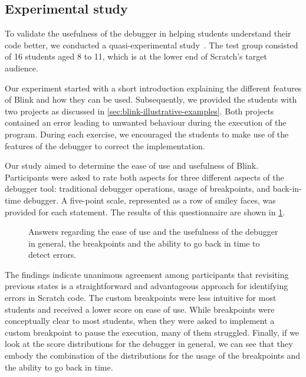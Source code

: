 \documentclass[../main]{subfiles}
\begin{document}
\subsection{Experimental study}\label{subsec:blink-experimental-study}
To validate the usefulness of the debugger in helping students understand their code better, we conducted a quasi-experimental study~\autocite{shadishExperimentalQuasiexperimentalDesigns2002}.
The test group consisted of 16 students aged 8 to 11, which is at the lower end of Scratch's target audience.

Our experiment started with a short introduction explaining the different features of Blink and how they can be used.
Subsequently, we provided the students with two projects as discussed in \cref{sec:blink-illustrative-examples}.
Both projects contained an error leading to unwanted behaviour during the execution of the program.
During each exercise, we encouraged the students to make use of the features of the debugger to correct the implementation.

Our study aimed to determine the ease of use and usefulness of Blink.
Participants were asked to rate both aspects for three different aspects of the debugger tool: traditional debugger operations, usage of breakpoints, and back-in-time debugger.
A five-point scale, represented as a row of smiley faces, was provided for each statement.
The results of this questionnaire are shown in \cref{fig:blink-results}.

\begin{figure}
    \centering
    
    \caption{
        Answers regarding the ease of use and the usefulness of the debugger in general,
        the breakpoints and the ability to go back in time to detect errors.
    }
    \label{fig:blink-results}
\end{figure}

The findings indicate unanimous agreement among participants that revisiting previous states is a straightforward and advantageous approach for identifying errors in Scratch code.
The custom breakpoints were less intuitive for most students and received a lower score on ease of use.
While breakpoints were conceptually clear to most students, when they were asked to implement a custom breakpoint to pause the execution, many of them struggled.
Finally, if we look at the score distributions for the debugger in general, we can see that they embody the combination of the distributions for the usage of the breakpoints and the ability to go back in time.
\end{document}
